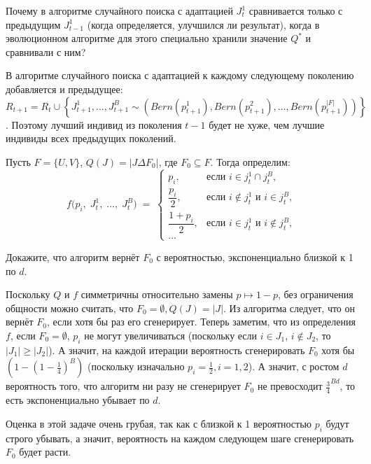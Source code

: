 \begin{problem}
Почему в алгоритме случайного поиска с адаптацией $J_t^1$ сравнивается только с предыдущим $J_{t-1}^1$ (когда определяется, улучшился ли результат), когда в эволюционном алгоритме для этого специально хранили значение $Q^*$ и сравнивали с ним?
\end{problem}
\begin{solution}
    В алгоритме случайного поиска с адаптацией к каждому следующему поколению добавляется и предыдущее:\\ $R_{t + 1} = R_t \cup \left\{J_{t + 1}^1, \ldots, J_{t + 1}^B \sim \left(Bern(p_{t + 1}^1), Bern(p_{t + 1}^2), \ldots, Bern(p_{t + 1}^{|F|})\right)\right\}$. Поэтому лучший индивид из поколения $t-1$ будет не хуже, чем лучшие индивиды всех предыдущих поколений.
\end{solution}

\begin{problem}
Пусть $F = \{U, V\}$, $Q(J) = |J \Delta F_0|$, где $F_0 \subseteq F$.
Тогда определим:
\[
    f\bigl(p_i,\; J_t^1,\;\ldots,\; J_t^B\bigr) \;=\;
    \begin{cases}
        p_i,                & \text{если } i \in j_t^1 \cap j_t^B,                \\
        \dfrac{p_i}{2},     & \text{если } i \notin j_t^1 \text{ и } i \in j_t^B, \\
        \dfrac{1 + p_i}{2}, & \text{если } i \in j_t^1 \text{ и } i \notin j_t^B, \\
        \ldots
    \end{cases}
\]

Докажите, что алгоритм вернёт $F_0$ с вероятностью, экспоненциально близкой к 1 по $d$.
\end{problem}
\begin{solution}
    Поскольку $Q$ и $f$ симметричны относительно замены $p \mapsto 1-p$, без ограничения общности можно считать, что $F_0 = \emptyset, Q(J) = |J|$. Из алгоритма следует, что он вернёт $F_0$, если хотя бы раз его сгенерирует. Теперь заметим, что из определения $f$, если $F_0 = \emptyset$, $p_i$ не могут увеличиваться (поскольку если $i \in J_1$, $i \notin J_2$, то $|J_1| \geqslant |J_2|$). А значит, на каждой итерации вероятность сгенерировать $F_0$ хотя бы $\left(1- \left(1 - \frac{1}{4}\right)^B\right)$ (поскольку изначально $p_i = \frac{1}{2}, i = 1,2$). А значит, с ростом $d$ вероятность того, что алгоритм ни разу не сгенерирует $F_0$ не превосходит $\frac{3}{4}^{Bd}$, то есть экспоненциально убывает по $d$.
\end{solution}
\begin{remark}
    Оценка в этой задаче очень грубая, так как с близкой к 1 вероятностью $p_i$ будут строго убывать, а значит, вероятность на каждом следующем шаге сгенерировать $F_0$ будет расти.
\end{remark}

